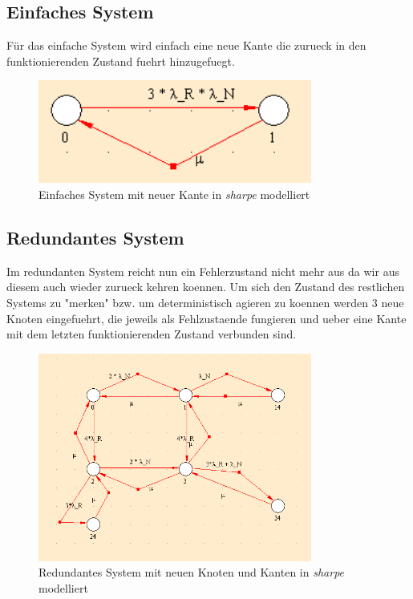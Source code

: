 \documentclass[10pt,a4paper]{article}
\begin{document}
\subsection{Einfaches System}
Für das einfache System wird einfach eine neue Kante die zurueck in den funktionierenden Zustand fuehrt hinzugefuegt.
\begin{figure}[ht!]
\centering
\includegraphics[width=90mm]{AVAILABILITY_Einfach.png}
\caption{Einfaches System mit neuer Kante in \textit{sharpe} modelliert \label{avail_einfach}}
\end{figure}

\subsection{Redundantes System}
Im redundanten System reicht nun ein Fehlerzustand nicht mehr aus da wir aus diesem auch wieder zurueck kehren koennen. Um sich den Zustand des restlichen Systems zu "merken" bzw. um deterministisch agieren zu koennen werden 3 neue Knoten eingefuehrt, die jeweils als Fehlzustaende fungieren und ueber eine Kante mit dem letzten funktionierenden Zustand verbunden sind. 
\begin{figure}[ht!]
\centering
\includegraphics[width=90mm]{AVAILABILITY_RED.png}
\caption{Redundantes System mit neuen Knoten und Kanten in \textit{sharpe} modelliert \label{avail_einfach}}
\end{figure}

\end{document}
